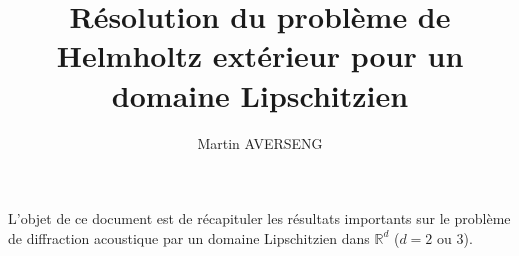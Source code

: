 \documentclass[11pt,a4paper]{article}
\author{Martin AVERSENG}
\title{Résolution du problème de Helmholtz extérieur pour un domaine Lipschitzien }
\begin{document}
\maketitle
\section*{}

L'objet de ce document est de récapituler les résultats importants sur le problème de diffraction acoustique par un domaine Lipschitzien dans $\mathbb{R}^d$ ($d=2$ ou $3$). 


\nocite{aboudTerrasse}

 
\end{document}

